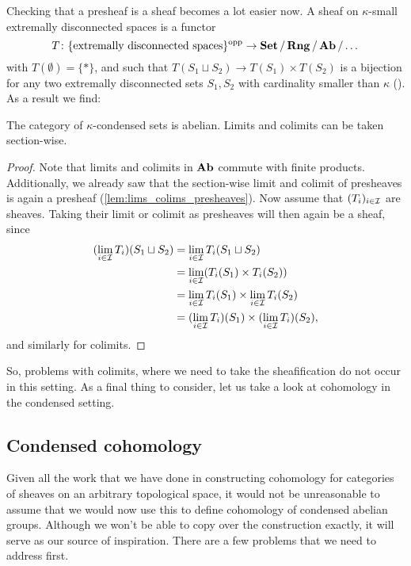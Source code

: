 \documentclass{article}
\DeclareMathOperator{\opp}{opp}
\begin{document}
Checking that a presheaf is a sheaf becomes a lot easier now.
A sheaf on $\kappa$-small
extremally disconnected spaces is a functor
\begin{equation*}
    T \colon \{\text{extremally disconnected spaces}\}^{\opp} \to \Set / \Rng / \Ab/ \dots
\end{equation*}
with $T(\emptyset) = \{*\}$, and
such that $T(S_1 \sqcup S_2) \to T(S_1) \times T(S_2)$ is a bijection
for any two extremally disconnected sets $S_1, S_2$
with cardinality smaller than $\kappa$ (\cite[Theorem 1.2.18]{Dag2021FoundationsCM}).
As a result we find:
\begin{corollary}
    The category of $\kappa$-condensed sets is abelian. Limits
    and colimits can be taken section-wise.
\end{corollary}
\begin{proof}
    Note that limits and colimits in $\operatorname{\mathbf{Ab}}$ commute with finite products.
    Additionally, we already saw that the section-wise limit and colimit
    of presheaves is again a presheaf (\cref{lem:lims_colims_presheaves}).
    Now assume that $(T_i)_{i\in \mathcal{I}}$ are sheaves. Taking their
    limit or colimit as presheaves will then again be a sheaf,
    since
    \begin{align*}
        (\lim_{i\in \mathcal{I}}T_i)(S_1 \sqcup S_2)
         & = \lim_{i\in \mathcal{I}} T_i(S_1 \sqcup S_2)                            \\
         & = \lim_{i\in \mathcal{I}} (T_i(S_1) \times T_i(S_2))                     \\
         & = \lim_{i\in \mathcal{I}} T_i(S_1) \times \lim_{i\in \mathcal{I}} T_i(S_2)      \\
         & = (\lim_{i\in \mathcal{I}} T_i)(S_1) \times (\lim_{i\in \mathcal{I}} T_i)(S_2),
    \end{align*}
    and similarly for colimits.
\end{proof}

So, problems with colimits, where we need to take the sheafification
do not occur in this setting. As a final thing to consider, let
us take a look at cohomology in the condensed setting.

\subsection{Condensed cohomology}

Given all the work that we have done in constructing cohomology
for categories of sheaves on an arbitrary topological space,
it would not be unreasonable to assume that we would now use this
to define cohomology of condensed abelian groups.
Although we won't be able to copy over the construction exactly,
it will serve as our source of inspiration. There are a few
problems that we need to address first.
\end{document}
